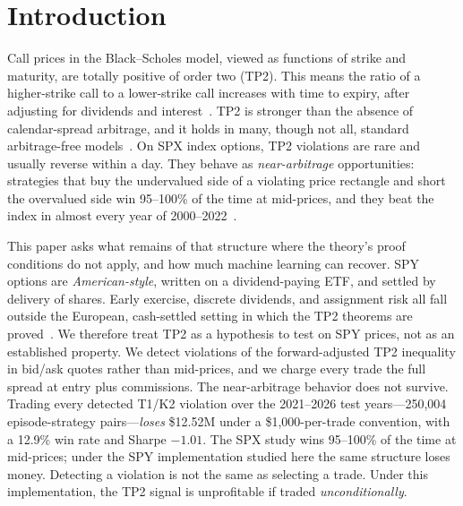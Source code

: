 \documentclass[sigconf,review,anonymous]{acmart}
\begin{document}


\maketitle

\section{Introduction}
\label{sec:intro}

Call prices in the Black--Scholes model, viewed as functions of strike and maturity, are totally positive of order two (TP2). This means the ratio of a higher-strike call to a lower-strike call increases with time to expiry, after adjusting for dividends and interest~\cite{glasserman2026tp2theory}. TP2 is stronger than the absence of calendar-spread arbitrage, and it holds in many, though not all, standard arbitrage-free models~\cite{glasserman2026tp2theory,glasserman2023convexity}. On SPX index options, TP2 violations are rare and usually reverse within a day. They behave as \emph{near-arbitrage} opportunities: strategies that buy the undervalued side of a violating price rectangle and short the overvalued side win 95--100\% of the time at mid-prices, and they beat the index in almost every year of 2000--2022~\cite{glasserman2025tp2}.

This paper asks what remains of that structure where the theory's proof conditions do not apply, and how much machine learning can recover. SPY options are \emph{American-style}, written on a dividend-paying ETF, and settled by delivery of shares. Early exercise, discrete dividends, and assignment risk all fall outside the European, cash-settled setting in which the TP2 theorems are proved~\cite{glasserman2026tp2theory,cosma2020earlyexercise}. We therefore treat TP2 as a hypothesis to test on SPY prices, not as an established property. We detect violations of the forward-adjusted TP2 inequality in bid/ask quotes rather than mid-prices, and we charge every trade the full spread at entry plus commissions. The near-arbitrage behavior does not survive. Trading every detected T1/K2 violation over the 2021--2026 test years---250{,}004 episode-strategy pairs---\emph{loses} \$12.52M under a \$1{,}000-per-trade convention, with a 12.9\% win rate and Sharpe $-1.01$. The SPX study wins 95--100\% of the time at mid-prices; under the SPY implementation studied here the same structure loses money. Detecting a violation is not the same as selecting a trade. Under this implementation, the TP2 signal is unprofitable if traded \emph{unconditionally}.
\end{document}
